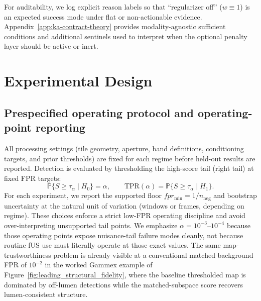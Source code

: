 \documentclass[11pt]{article}
\newif\ifSTAPPAPERONLY
\newcommand{\SuppOrApp}[1]{\ifSTAPPAPERONLY Supplementary Material\else Appendix~\ref{#1}\fi}
\begin{document}
For auditability, we log explicit reason labels so that ``regularizer off'' ($w\equiv 1$) is an expected success mode under flat or non-actionable evidence. \SuppOrApp{app:ka-contract-theory} provides modality-agnostic sufficient conditions and additional sentinels used to interpret when the optional penalty layer should be active or inert.

\section{Experimental Design}
\label{sec:experimental-design}

\subsection{Prespecified operating protocol and operating-point reporting}
\label{sec:eval}
All processing settings (tile geometry, aperture, band definitions, conditioning targets, and prior thresholds) are fixed for each regime before held-out results are reported. Detection is evaluated by thresholding the high-score tail (right tail) at fixed FPR targets:
\[
  \mathbb{P}\{S\ge \tau_\alpha\mid H_0\}=\alpha,\qquad
  \mathrm{TPR}(\alpha)=\mathbb{P}\{S\ge \tau_\alpha\mid H_1\}.
\]
For each experiment, we report the supported floor $fpr_{\min}=1/n_{\mathrm{neg}}$ and bootstrap uncertainty at the natural unit of variation (windows or frames, depending on regime). These choices enforce a strict low-FPR operating discipline and avoid over-interpreting unsupported tail points.
We emphasize $\alpha=10^{-3}$--$10^{-4}$ because those operating points expose nuisance-tail failure modes cleanly, not because routine fUS use must literally operate at those exact values. The same map-trustworthiness problem is already visible at a conventional matched background FPR of $10^{-2}$ in the worked Gammex example of Figure~\ref{fig:leading_structural_fidelity}, where the baseline thresholded map is dominated by off-lumen detections while the matched-subspace score recovers lumen-consistent structure.
\end{document}
